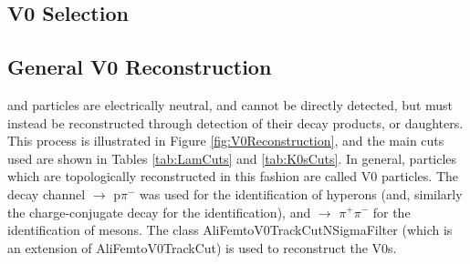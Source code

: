 \documentclass[/home/jesse/Analysis/FemtoAnalysis/AnalysisNotes/AnalysisNoteJBuxton.tex]{subfiles}
\begin{document}
\subsection{V0 Selection}
\label{V0Selection}

\subsection{General V0 Reconstruction}
\label{GenV0Reco}

\LamALam and \Ks particles are electrically neutral, and cannot be directly detected, but must instead be reconstructed through detection of their decay products, or daughters.  
This process is illustrated in Figure \ref{fig:V0Reconstruction}, and the main cuts used are shown in Tables \ref{tab:LamCuts} and \ref{tab:K0sCuts}.
In general, particles which are topologically reconstructed in this fashion are called V0 particles.
The decay channel \Lam $\rightarrow$ p$\pi^{-}$ was used for the identification of \Lam hyperons (and, similarly the charge-conjugate decay for the \ALam identification), and \Ks $\rightarrow$ $\pi^{+}\pi^{-}$ for the identification of \Ks mesons.
The class AliFemtoV0TrackCutNSigmaFilter (which is an extension of AliFemtoV0TrackCut) is used to reconstruct the V0s.

\end{document}
